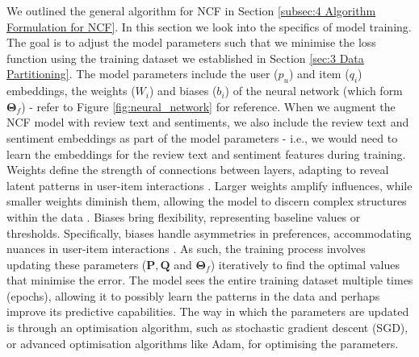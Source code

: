 We outlined the general algorithm for NCF in Section \ref{subsec:4 Algorithm Formulation for NCF}. In this section we look into the specifics of model training. The goal is to adjust the model parameters such that we minimise the loss function using the training dataset we established in Section \ref{sec:3 Data Partitioning}. The model parameters include the user ($p_u$) and item ($q_i$) embeddings, the weights ($W_i$) and biases ($b_i$) of the neural network (which form $\boldsymbol{\Theta}_f$) - refer to Figure \ref{fig:neural_network} for reference. When we augment the NCF model with review text and sentiments, we also include the review text and sentiment embeddings as part of the model parameters - i.e., we would need to learn the embeddings for the review text and sentiment features during training. Weights define the strength of connections between layers, adapting to reveal latent patterns in user-item interactions \cite{abdi1999neural}. Larger weights amplify influences, while smaller weights diminish them, allowing the model to discern complex structures within the data \cite{gurney2018introduction}. Biases bring flexibility, representing baseline values or thresholds. Specifically, biases handle asymmetries in preferences, accommodating nuances in user-item interactions \cite{he2017neural}. As such, the training process involves updating these parameters ($\mathbf{P}, \mathbf{Q}$ and $\boldsymbol{\Theta}_f$) iteratively to find the optimal values that minimise the error. The model sees the entire training dataset multiple times (epochs), allowing it to possibly learn the patterns in the data and perhaps improve its predictive capabilities. The way in which the parameters are updated is through an optimisation algorithm, such as stochastic gradient descent (SGD), or advanced optimisation algorithms like Adam, for optimising the parameters. 

